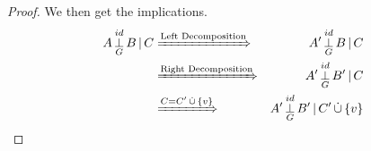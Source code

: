 \begin{Thm}
\begin{proof}
We then get the implications.
\begin{align*}
A  \idPerp_G  B \given C 
& \xRightarrow{\text{Left Decomposition}}  & A' \idPerp_G  B \given C \\
& \xRightarrow{\text{Right Decomposition}}  & A' \idPerp_G  B' \given C \\
& \xRightarrow{C = C' \dcup \{v\}}  & A' \idPerp_G  B' \given C'\dcup\{v\} \\
\end{align*}




\end{proof}
\end{Thm}
